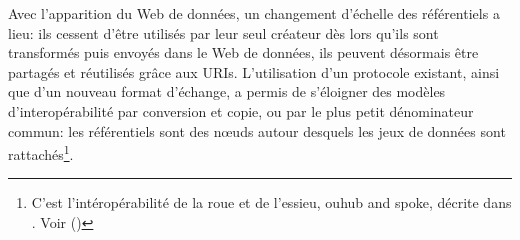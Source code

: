 \bigskip
\bigskip
Avec l'apparition du Web de données, un changement d'échelle des référentiels a lieu: ils cessent d'être utilisés par leur seul créateur dès lors qu'ils sont transformés puis envoyés dans le Web de données, ils peuvent désormais être partagés et réutilisés grâce aux URIs. L'utilisation d'un protocole existant, ainsi que d'un nouveau format d'échange, a permis de s'éloigner des modèles d'interopérabilité par conversion et copie, ou par le plus petit dénominateur commun: les référentiels sont des nœuds autour desquels les jeux de données sont rattachés\footnote{C'est l'intéropérabilité de la \og roue et de l'essieu\fg{}, ou\og hub and spoke\fg{}, décrite dans \cite{bermes_convergence_2013}. Voir  ()}. 